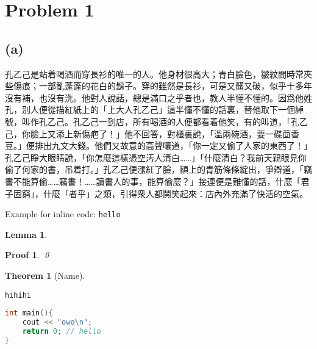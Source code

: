 \documentclass[10pt]{article}
\theoremstyle{owo}
\newtheorem{Theorem}{Theorem}
\newtheorem{Lemma}{Lemma}
\newtheorem*{Proof}{Proof}
\begin{document}
\renewcommand{\headrulewidth}{1pt}
\setlength\parindent{20pt}
\setlength\parskip{10pt}
\cfoot{\thepage}


\section*{Problem 1}

\subsection*{(a)}

孔乙己是站着喝酒而穿長衫的唯一的人。他身材很高大；青白臉色，皺紋間時常夾些傷痕；一部亂蓬蓬的花白的鬍子。穿的雖然是長衫，可是又髒又破，似乎十多年沒有補，也沒有洗。他對人說話，總是滿口之乎者也，教人半懂不懂的。因爲他姓孔，別人便從描紅紙上的「上大人孔乙己」這半懂不懂的話裏，替他取下一個綽號，叫作孔乙己。孔乙己一到店，所有喝酒的人便都看着他笑，有的叫道，「孔乙己，你臉上又添上新傷疤了！」他不回答，對櫃裏說，「溫兩碗酒，要一碟茴香豆。」便排出九文大錢。他們又故意的高聲嚷道，「你一定又偷了人家的東西了！」孔乙己睜大眼睛說，「你怎麼這樣憑空汚人清白……」「什麼清白？我前天親眼見你偷了何家的書，吊着打。」孔乙己便漲紅了臉，額上的青筋條條綻出，爭辯道，「竊書不能算偷……竊書！……讀書人的事，能算偷麼？」接連便是難懂的話，什麼「君子固窮」，什麼「者乎」之類，引得衆人都鬨笑起來：店內外充滿了快活的空氣。

Example for inline code: \texttt{hello}

\lipsum[1]

\begin{Lemma}
    \lipsum[2]
\end{Lemma}

\begin{Proof}
    \lipsum[3]
    \qed
\end{Proof}

\begin{Theorem}[Name]
    \lipsum[4]
\end{Theorem}

\begin{lstlisting}
hihihi
\end{lstlisting}

\lipsum[9]

\begin{lstlisting}[language=C++]
int main(){
    cout << "owo\n";
    return 0; // hello
}
\end{lstlisting}
\end{document}
